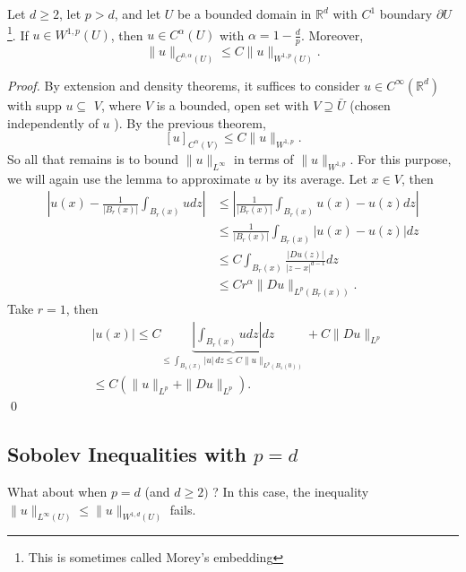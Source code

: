  \begin{theorem}
     Let $d \geq 2$, let $p>d$, and let $U$ be a bounded domain in $\mathbb{R}^{d}$ with $C^{1}$ boundary $\partial U$ \footnote{This is sometimes called Morey's embedding}. If $u \in W^{1, p}(U)$, then $u \in C^{\alpha}(U)$ with $\alpha=1-\frac{d}{p}$. Moreover,
    $$
    \|u\|_{C^{0,\alpha}(U)} \leq C\|u\|_{W^{1, p}(U)} .
    $$
 \end{theorem}
 \begin{proof}
    By extension and density theorems, it suffices to consider $u \in C^{\infty}\left(\mathbb{R}^{d}\right)$ with supp $u \subseteq$ $V$, where $V$ is a bounded, open set with $V \supseteq \bar{U}$ (chosen independently of $u$ ). By the previous theorem,
    $$
    [u]_{C^{\alpha}(V)} \leq C\|u\|_{W^{1, p}} .
    $$
    So all that remains is to bound $\|u\|_{L^{\infty}}$ in terms of $\|u\|_{W^{1, p}}$. For this purpose, we will again use the lemma to approximate $u$ by its average. Let $x \in V$, then
    \[
        \begin{aligned}
            \left|u(x)-\frac{1}{\left|B_{r}(x)\right|} \int_{B_{r}(x)} u d z\right| & \leq\left|\frac{1}{\left|B_{r}(x)\right|} \int_{B_{r}(x)} u(x)-u(z) d z\right| \\
            & \leq \frac{1}{\left|B_{r}(x)\right|} \int_{B_{r}(x)}|u(x)-u(z)| d z \\
            & \leq C \int_{B_{r}(x)} \frac{|D u(z)|}{|z-x|^{d-1}} d z \\
            & \leq C r^{\alpha}\|D u\|_{L^{p}\left(B_{r}(x)\right)} .
            \end{aligned}
    \]
    Take $r=1$, then 
    \[
        \begin{aligned}
            &|u(x)| \leq C \underbrace{\left|\int_{B_{r}(x)} u d z\right| d z }_{\leq \int_{B_1(x)}|u|\,dz\leq C\|u\|_{L^p(B_1(0))}}+C\|D u\|_{L^p}\\
            &\leq C\left(\|u\|_{L^{p}}+\|D u\|_{L^{p}}\right) \text {. }
            \end{aligned}
    \]
    \qed 
 \end{proof}

 \subsection{Sobolev Inequalities with $p=d$}

 What about when $p=d$ (and $d \geq 2)$ ? In this case, the inequality $\|u\|_{L^{\infty}(U)} \leq\|u\|_{W^{1, d}(U)}$ fails.
 
